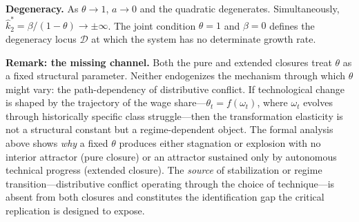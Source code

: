 \textbf{Degeneracy.} As $\theta \to 1$, $a \to 0$ and the quadratic degenerates. Simultaneously, $\hat{k}_2^* = \beta/(1-\theta) \to \pm\infty$. The joint condition $\theta = 1$ and $\beta = 0$ defines the degeneracy locus $\mathcal{D}$ at which the system has no determinate growth rate.

\textbf{Remark: the missing channel.} Both the pure and extended closures treat $\theta$ as a fixed structural parameter. Neither endogenizes the mechanism through which $\theta$ might vary: the path-dependency of distributive conflict. If technological change is shaped by the trajectory of the wage share---$\theta_t = f(\omega_t)$, where $\omega_t$ evolves through historically specific class struggle---then the transformation elasticity is not a structural constant but a regime-dependent object. The formal analysis above shows \textit{why} a fixed $\theta$ produces either stagnation or explosion with no interior attractor (pure closure) or an attractor sustained only by autonomous technical progress (extended closure). The \textit{source} of stabilization or regime transition---distributive conflict operating through the choice of technique---is absent from both closures and constitutes the identification gap the critical replication is designed to expose.
